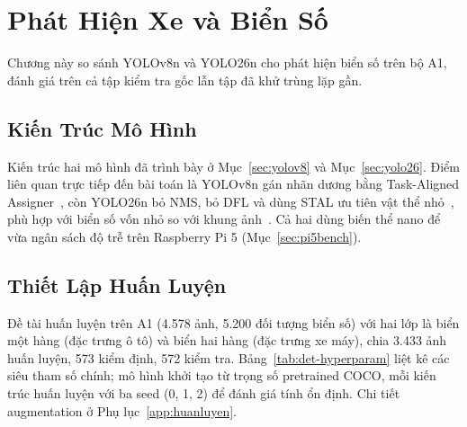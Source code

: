 \chapter{Phát Hiện Xe và Biển Số}
\label{ch:phathien}

Chương này so sánh YOLOv8n và YOLO26n cho phát hiện biển số trên bộ A1, đánh giá trên cả
tập kiểm tra gốc lẫn tập đã khử trùng lặp gần.

\section{Kiến Trúc Mô Hình}
\label{sec:phathien-kientruc}

Kiến trúc hai mô hình đã trình bày ở Mục~\ref{sec:yolov8} và Mục~\ref{sec:yolo26}. Điểm
liên quan trực tiếp đến bài toán là YOLOv8n gán nhãn dương bằng Task-Aligned
Assigner~\autocite{jocher2023yolov8,feng2021tood}, còn YOLO26n bỏ NMS, bỏ DFL và dùng STAL ưu
tiên vật thể nhỏ~\autocite{jocher2026yolo26,chakrabarty2026yolo26nmsfree}, phù hợp với biển số
vốn nhỏ so với khung ảnh~\autocite{zhu2025licenseplate}. Cả hai dùng biến thể nano để vừa
ngân sách độ trễ trên Raspberry Pi 5 (Mục~\ref{sec:pi5bench}).

\section{Thiết Lập Huấn Luyện}
\label{sec:phathien-huanluyen}

Đề tài huấn luyện trên A1 (4.578 ảnh, 5.200 đối tượng biển số) với hai lớp là biển một hàng
(đặc trưng ô tô) và biển hai hàng (đặc trưng xe máy), chia 3.433 ảnh huấn luyện, 573 kiểm
định, 572 kiểm tra. Bảng~\ref{tab:det-hyperparam} liệt kê các siêu tham số chính; mô hình
khởi tạo từ trọng số pretrained COCO, mỗi kiến trúc huấn luyện với ba seed (0, 1, 2) để đánh
giá tính ổn định. Chi tiết augmentation ở Phụ lục~\ref{app:huanluyen}.

